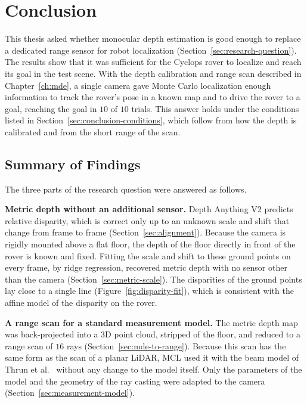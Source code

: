 \chapter{Conclusion}
\label{ch:conclusion}

This thesis asked whether monocular depth estimation is good enough to replace a dedicated range
sensor for robot localization (Section~\ref{sec:research-question}). The results show that it
was sufficient for the Cyclops rover to localize and reach its goal in the test scene. With the depth calibration and range scan described in Chapter~\ref{ch:mde}, a single camera
gave Monte Carlo localization enough information to track the rover's pose in a known map and to
drive the rover to a goal, reaching the goal in $10$ of $10$ trials. This answer holds under the conditions listed in
Section~\ref{sec:conclusion-conditions}, which follow from how the depth is calibrated and from
the short range of the scan.

\section{Summary of Findings}
\label{sec:conclusion-findings}

The three parts of the research question were answered as follows.

\textbf{Metric depth without an additional sensor.} Depth Anything V2 predicts relative disparity,
which is correct only up to an unknown scale and shift that change from frame to frame
(Section~\ref{sec:alignment}). Because the camera is rigidly mounted above a flat floor, the depth
of the floor directly in front of the rover is known and fixed. Fitting the scale and shift to
these ground points on every frame, by ridge regression, recovered metric depth with no sensor
other than the camera (Section~\ref{sec:metric-scale}). The disparities of the ground points lay
close to a single line (Figure~\ref{fig:disparity-fit}), which is consistent with the affine model
of the disparity on the rover.

\textbf{A range scan for a standard measurement model.} The metric depth map was back-projected
into a 3D point cloud, stripped of the floor, and reduced to a range scan of $16$ rays
(Section~\ref{sec:mde-to-range}). Because this scan has the same form as the scan of a planar
LiDAR, MCL used it with the beam model of Thrun et al.~\cite{thrun2005probabilistic} without any
change to the model itself. Only the parameters of the model and the geometry of the ray casting
were adapted to the camera (Section~\ref{sec:measurement-model}).

